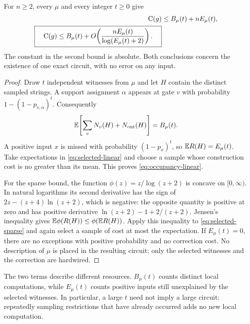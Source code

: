 \begin{theorem}\label{thm:occupancy}
For $n\ge2$, every $\mu$ and every integer $t\ge0$ give
\begin{align}
 \mathrm{C}(g)&\le B_\mu(t)+nE_\mu(t),\label{eq:occupancy-linear}\\
 \boxed{\quad
 \mathrm{C}(g)\le B_\mu(t)
   +O\!\left(\frac{nE_\mu(t)}{\log(E_\mu(t)+2)}\right).
 \quad}\label{eq:occupancy-master}
\end{align}
The constant in the second bound is absolute. Both conclusions concern
the existence of one exact circuit, with no error on any input.
\end{theorem}
\begin{proof}
Draw $t$ independent witnesses from $\mu$ and let $H$ contain the
distinct sampled strings. A support assignment $\alpha$ appears at
gate $v$ with probability $1-(1-p_{v,\alpha})^t$. Consequently
\[
 \mathbb{E}\!\left[\sum_v N_v(H)+N_{\mathrm{out}}(H)\right]=B_\mu(t).
\]
A positive input $x$ is missed with probability $(1-p_x)^t$, so
$\mathbb{E} R(H)=E_\mu(t)$. Take expectations in
\eqref{eq:selected-linear} and choose a sample whose construction cost
is no greater than its mean. This proves \eqref{eq:occupancy-linear}.

For the sparse bound, the function $\phi(z)=z/\log(z+2)$ is concave
on $[0,\infty)$. In natural logarithms its second derivative has the
sign of $2z-(z+4)\ln(z+2)$, which is negative: the opposite quantity
is positive at zero and has positive derivative
$\ln(z+2)-1+2/(z+2)$. Jensen's inequality gives
$\mathbb{E}\phi(R(H))\le\phi(\mathbb{E} R(H))$. Apply this inequality to
\eqref{eq:selected-sparse} and again select a sample of cost at most
the expectation. If $E_\mu(t)=0$, there are no exceptions with
positive probability and no correction cost. No description of $\mu$
is placed in the resulting circuit; only the selected witnesses and
the correction are hardwired.
\end{proof}

The two terms describe different resources. $B_\mu(t)$ counts distinct
local computations, while $E_\mu(t)$ counts positive inputs still
unexplained by the selected witnesses. In particular, a large $t$ need
not imply a large circuit: repeatedly sampling restrictions that have
already occurred adds no new local computation.

